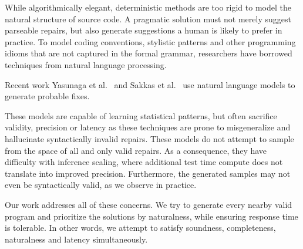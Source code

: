 While algorithmically elegant, deterministic methods are too rigid to model the natural structure of source code. A pragmatic solution must not merely suggest parseable repairs, but also generate suggestions a human is likely to prefer in practice. To model coding conventions, stylistic patterns and other programming idioms that are not captured in the formal grammar, researchers have borrowed techniques from natural language processing.

Recent work Yasunaga et al.~\cite{yasunaga2021break} and Sakkas et al.~\cite{sakkas2022seq2parse} use natural language models to generate probable fixes.

These models are capable of learning statistical patterns, but often sacrifice validity, precision or latency as these techniques are prone to misgeneralize and hallucinate syntactically invalid repairs.
These models do not attempt to sample from the space of all and only valid repairs. As a consequence, they have difficulty with inference scaling, where additional test time compute does not translate into improved precision. Furthermore, the generated samples may not even be syntactically valid, as we observe in practice.


Our work addresses all of these concerns. We try to generate every nearby valid program and prioritize the solutions by naturalness, while ensuring response time is tolerable. In other words, we attempt to satisfy soundness, completeness, naturalness and latency simultaneously.


\clearpage